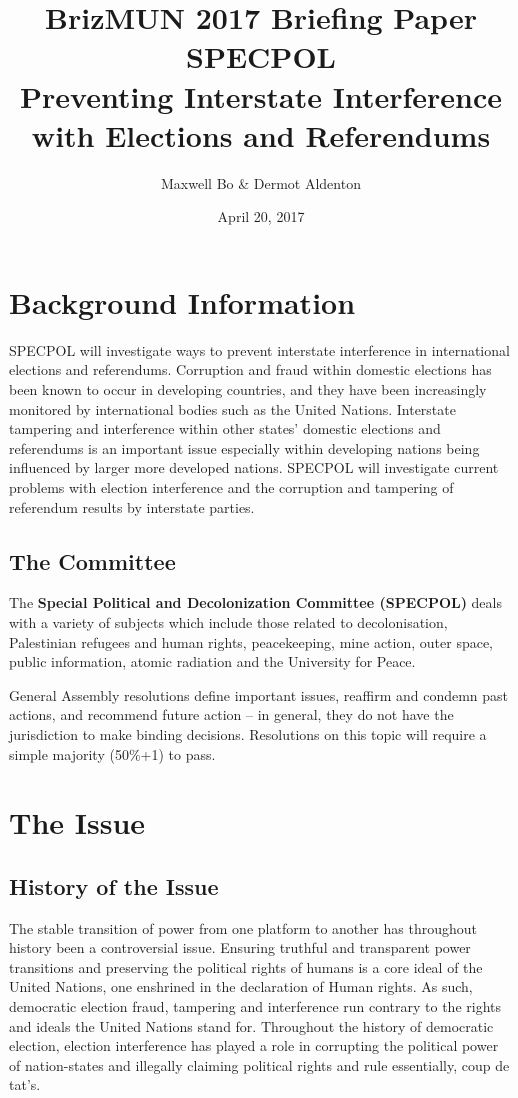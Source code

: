 \documentclass[11pt,a4paper]{report}
\begin{document}
\title{BrizMUN 2017 Briefing Paper \\ SPECPOL \\ Preventing Interstate Interference with Elections and Referendums}
\author{Maxwell Bo \& Dermot Aldenton}
\date{April 20, 2017}
\maketitle


\chapter{Background Information}

SPECPOL will investigate ways to prevent interstate interference in international elections and referendums. Corruption and fraud within domestic elections has been known to occur in developing countries, and they have been increasingly monitored by international bodies such as the United Nations. Interstate tampering and interference within other states’ domestic elections and referendums is an important issue especially within developing nations being influenced by larger more developed nations. SPECPOL will investigate current problems with election interference and the corruption and tampering of referendum results by interstate parties.

\section{The Committee}

The \textbf{Special Political and Decolonization Committee (SPECPOL)} deals with a variety of subjects which include those related to decolonisation, Palestinian refugees and human rights, peacekeeping, mine action, outer space, public information, atomic radiation and the University for Peace. 

General Assembly resolutions define important issues, reaffirm and condemn past actions, and recommend future action – in general, they do not have the jurisdiction to make binding decisions. Resolutions on this topic will require a simple majority (50\%+1) to pass.

\chapter{The Issue}
\section{History of the Issue}
The stable transition of power from one platform to another has throughout history been a controversial issue. Ensuring truthful and transparent power transitions and preserving the political rights of humans is a core ideal of the United Nations, one enshrined in the declaration of Human rights. As such, democratic election fraud, tampering and interference run contrary to the rights and ideals the United Nations stand for. Throughout the history of democratic election, election interference has played a role in corrupting the political power of nation-states and illegally claiming political rights and rule essentially, coup de tat's.
\end{document}
